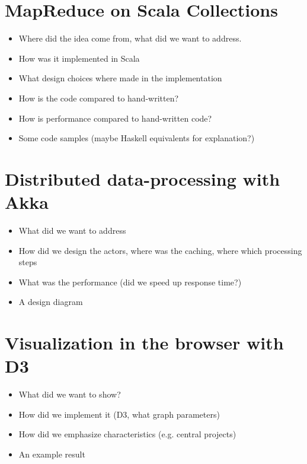 \documentclass[10pt,a4paper]{article}
\begin{document}
\section{MapReduce on Scala Collections}\label{sec:mapreduce}

\begin{itemize}
    \item Where did the idea come from, what did we want to address.
    \item How was it implemented in Scala
    \item What design choices where made in the implementation
    \item How is the code compared to hand-written?
    \item How is performance compared to hand-written code?
    \item Some code samples (maybe Haskell equivalents for explanation?)
\end{itemize}

\section{Distributed data-processing with Akka}\label{sec:distributed}

\begin{itemize}
    \item What did we want to address
    \item How did we design the actors, where was the caching, where which processing steps
    \item What was the performance (did we speed up response time?)
    \item A design diagram
\end{itemize}

\section{Visualization in the browser with D3}\label{sec:visualization}

\begin{itemize}
    \item What did we want to show?
    \item How did we implement it (D3, what graph parameters)
    \item How did we emphasize characteristics (e.g. central projects)
    \item An example result
\end{itemize}
\end{document}

